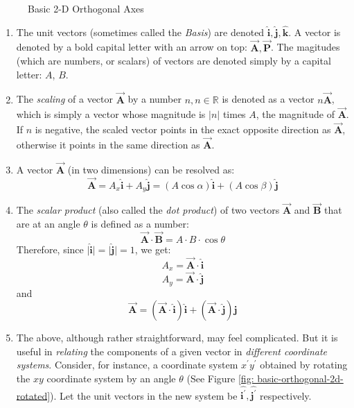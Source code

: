 \documentclass[12pt,a4paper]{book}
\newcommand{\vect}[1]{\pmb{\vec{#1}}}
\newcommand{\uvec}[1]{\pmb{\hat{#1}}}
\begin{document}
\begin{enumerate}
\begin{enumerate}
\begin{figure}[h!]
                    \caption{Basic 2-D Orthogonal Axes}
                    \label{fig: basic-orthogonal-2d}
                \end{figure}
                \begin{enumerate}
                    \item The unit vectors (sometimes called the \emph{Basis}) are denoted $\uvec{i}, \uvec{j}, \uvec{k}$. A vector is denoted by a bold capital letter with an arrow on top: $\vect{A}, \vect{P}$. The magitudes (which are numbers, or scalars) of vectors are denoted simply by a capital letter: $A$, $B$. 
                    \item The \emph{scaling} of a vector $\vect{A}$ by a number $n, n\in\mathbb{R}$ is denoted as a vector $n\vect{A}$, which is simply a vector whose magnitude is $\lvert n\rvert$ times $A$, the magnitude of $\vect{A}$. If $n$ is negative, the scaled vector points in the exact opposite direction as $\vect{A}$, otherwise it points in the same direction as $\vect{A}$.
                    \item A vector $\vect{A}$ (in two dimensions) can be resolved as:
                        $$
                            \vect{A} = A_{x}\uvec{i}+A_{y}\uvec{j}
                                     = (A\cos\alpha)\uvec{i} + (A\cos\beta)\uvec{j}
                        $$
                    \item The \emph{scalar product} (also called the \emph{dot product}) of two vectors $\vect{A}$ and $\vect{B}$ that are at an angle $\theta$ is defined as a number:
                        $$
                        \vect{A}\cdot\vect{B} = A\cdot B\cdot\cos\theta
                        $$
                        Therefore, since $\lvert\uvec{i}\rvert = \lvert\uvec{j}\rvert = 1$, we get:
                        $$
                            A_x = \vect{A}\cdot\uvec{i}
                        $$
                        $$
                            A_y = \vect{A}\cdot\uvec{j}
                        $$
                        and
                        $$
                            \vect{A} = (\vect{A}\cdot\uvec{i})\uvec{i}+(\vect{A}\cdot\uvec{j})\uvec{j}
                        $$
                    \item The above, although rather straightforward, may feel complicated. But it is useful in \emph{relating} the components of a given vector in \emph{different coordinate systems}. Consider, for instance, a coordinate system $x^\prime y^\prime$ obtained by rotating the $xy$ coordinate system by an angle $\theta$ (See Figure \ref{fig: basic-orthogonal-2d-rotated}). Let the unit vectors in the new system be $\uvec{i^\prime}, \uvec{j^\prime}$ respectively.

\end{enumerate}
\end{enumerate}
\end{enumerate}
\end{document}
